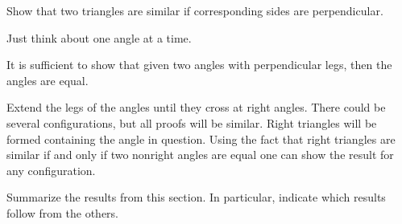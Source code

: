 \documentclass[newpage,hints,handout,12pt,noauthor,nooutcomes]{ximera}
\begin{document}
\begin{problem}
Show that two triangles are similar if corresponding sides are perpendicular.
\begin{hint}
Just think about one angle at a time.
\end{hint}
\begin{freeResponse}
It is sufficient to show that given two angles with perpendicular
legs, then the angles are equal.

Extend the legs of the angles until they cross at right angles. There
could be several configurations, but all proofs will be similar. Right
triangles will be formed containing the angle in question. Using the
fact that right triangles are similar if and only if two nonright
angles are equal one can show the result for any configuration. 
\end{freeResponse}
\end{problem}


\begin{problem}
Summarize the results from this section. In particular, indicate which
results follow from the others.
\begin{freeResponse}
\end{freeResponse}
\end{problem}
\end{document}
